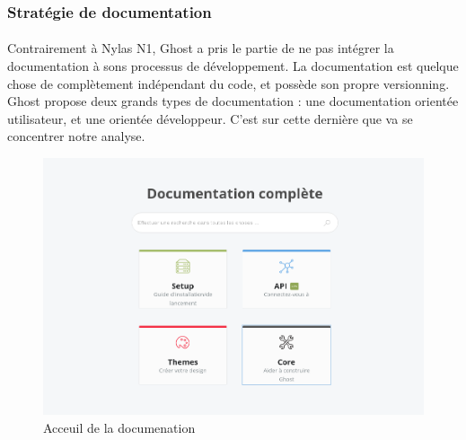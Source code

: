     \subsubsection{Stratégie de documentation}
        \paragraph{}
            Contrairement à Nylas N1, Ghost a pris le partie de ne pas intégrer la documentation à sons processus
            de développement. La documentation est quelque chose de complètement indépendant du code,
            et possède son propre versionning. Ghost propose deux grands types de documentation : une documentation
            orientée utilisateur, et une orientée développeur. C'est sur cette dernière que va se concentrer
            notre analyse.

        \begin{figure}[h]
            \centering
            \includegraphics[scale=0.35]{./assets/ghost1.png}
            \caption{Acceuil de la documenation}
        \end{figure}

